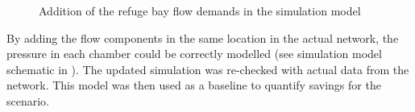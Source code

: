 	\begin{figure}[h]
		\centering
		\caption{Addition of the refuge bay flow demands in the simulation model}
		\label{fig: Refuge bay layout}
	\end{figure}
	\par
	By adding the flow components in the same location in the actual network, the pressure in each chamber could be correctly modelled (see simulation model schematic in ). The updated simulation was re-checked with actual data from the network. This model was then used as a baseline to quantify savings for the scenario.
